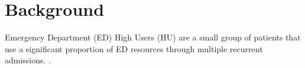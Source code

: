 \documentclass{bmcart}
\begin{document}
\begin{frontmatter}
\begin{abstractbox}
\begin{keyword}

\end{keyword}


\end{abstractbox}
%

\end{frontmatter}



\section*{Background}
Emergency Department (ED) High Users (HU) are a small group of patients that use a significant proportion of ED resources through multiple recurrent admissions.  \cite{abello_care_2012, chiu_statistical_2019, blank_descriptive_2005}. 
\end{document}
